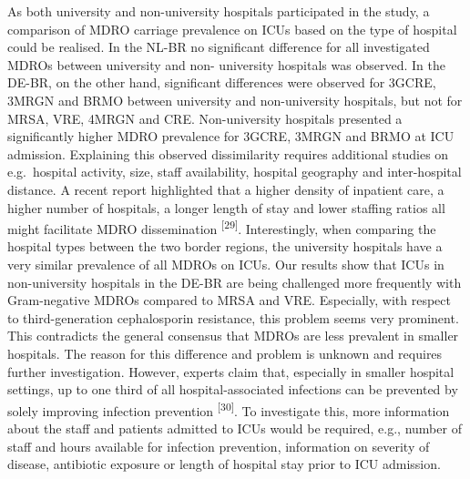 \documentclass[
]{book}
\begin{document}
As both university and non-university hospitals participated in the study, a comparison of MDRO carriage prevalence on ICUs based on the type of hospital could be realised. In the NL-BR no significant difference for all investigated MDROs between university and non- university hospitals was observed. In the DE-BR, on the other hand, significant differences were observed for 3GCRE, 3MRGN and BRMO between university and non-university hospitals, but not for MRSA, VRE, 4MRGN and CRE. Non-university hospitals presented a significantly higher MDRO prevalence for 3GCRE, 3MRGN and BRMO at ICU admission. Explaining this observed dissimilarity requires additional studies on e.g.~hospital activity, size, staff availability, hospital geography and inter-hospital distance. A recent report highlighted that a higher density of inpatient care, a higher number of hospitals, a longer length of stay and lower staffing ratios all might facilitate MDRO dissemination \textsuperscript{{[}29{]}}. Interestingly, when comparing the hospital types between the two border regions, the university hospitals have a very similar prevalence of all MDROs on ICUs. Our results show that ICUs in non-university hospitals in the DE-BR are being challenged more frequently with Gram-negative MDROs compared to MRSA and VRE. Especially, with respect to third-generation cephalosporin resistance, this problem seems very prominent. This contradicts the general consensus that MDROs are less prevalent in smaller hospitals. The reason for this difference and problem is unknown and requires further investigation. However, experts claim that, especially in smaller hospital settings, up to one third of all hospital-associated infections can be prevented by solely improving infection prevention \textsuperscript{{[}30{]}}. To investigate this, more information about the staff and patients admitted to ICUs would be required, e.g., number of staff and hours available for infection prevention, information on severity of disease, antibiotic exposure or length of hospital stay prior to ICU admission.
\end{document}
